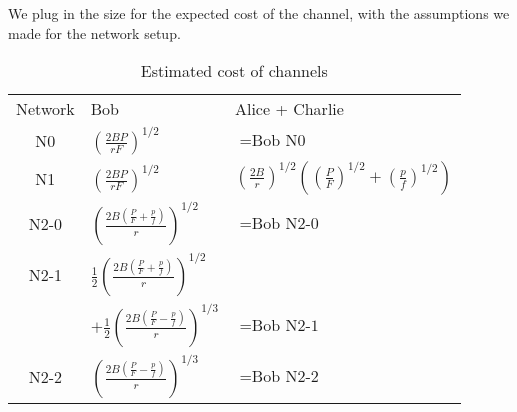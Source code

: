 \documentclass[twocolumn,10pt]{report}
\begin{document}
We plug in the size for the expected cost of the channel, with the assumptions we made for the network setup. 
\begin{table}[t]
\caption{Estimated cost of channels}
\begin{center}
\label{table_ASME}
\begin{tabular}{c l l}
& &  \\ %
\hline
Network & Bob & Alice + Charlie \\
\hline
N0 & $(\frac{2BP}{rF})^{1/2}$ & $=\text{Bob  N0}$ \\
N1 & $(\frac{2BP}{rF})^{1/2}$ & $(\frac{2B}{r})^{1/2}((\frac{P}{F})^{1/2}+(\frac{p}{f})^{1/2})$\\
N2-0 & $(\frac{2B(\frac{P}{F}+\frac{p}{f})}{r})^{1/2}$& $=\text{Bob  N2-0}$ \\
N2-1 & $\frac{1}{2}(\frac{2B(\frac{P}{F}+\frac{p}{f})}{r})^{1/2}$\\
& $+\frac{1}{2}(\frac{2B(\frac{P}{F}-\frac{p}{f})}{r})^{1/3}$& $=\text{Bob  N2-1}$ \\
N2-2 & $(\frac{2B(\frac{P}{F}-\frac{p}{f})}{r})^{1/3}$& $=\text{Bob  N2-2}$ \\
\hline
\end{tabular}
\end{center}
\end{table}
\end{document}
